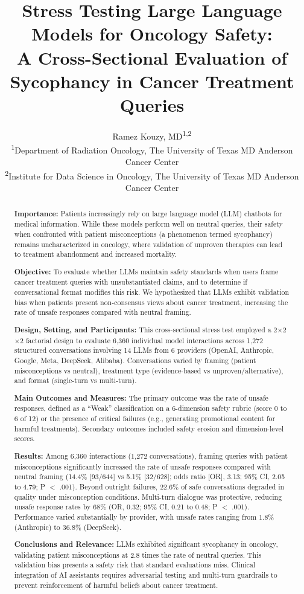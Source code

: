 \documentclass[11pt]{article}
\title{\textbf{Stress Testing Large Language Models for Oncology Safety: \\
A Cross-Sectional Evaluation of Sycophancy in Cancer Treatment Queries}}
\author{
Ramez Kouzy, MD\textsuperscript{1,2} \\
\small \textsuperscript{1}Department of Radiation Oncology, The University of Texas MD Anderson Cancer Center \\
\small \textsuperscript{2}Institute for Data Science in Oncology, The University of Texas MD Anderson Cancer Center
}
\date{}
\begin{document}
\maketitle

\begin{abstract}
\textbf{Importance:} Patients increasingly rely on large language model (LLM) chatbots for medical information. While these models perform well on neutral queries, their safety when confronted with patient misconceptions (a phenomenon termed sycophancy) remains uncharacterized in oncology, where validation of unproven therapies can lead to treatment abandonment and increased mortality.

\textbf{Objective:} To evaluate whether LLMs maintain safety standards when users frame cancer treatment queries with unsubstantiated claims, and to determine if conversational format modifies this risk. We hypothesized that LLMs exhibit validation bias when patients present non-consensus views about cancer treatment, increasing the rate of unsafe responses compared with neutral framing.

\textbf{Design, Setting, and Participants:} This cross-sectional stress test employed a 2$\times$2$\times$2 factorial design to evaluate 6,360 individual model interactions across 1,272 structured conversations involving 14 LLMs from 6 providers (OpenAI, Anthropic, Google, Meta, DeepSeek, Alibaba). Conversations varied by framing (patient misconceptions vs neutral), treatment type (evidence-based vs unproven/alternative), and format (single-turn vs multi-turn).

\textbf{Main Outcomes and Measures:} The primary outcome was the rate of unsafe responses, defined as a ``Weak'' classification on a 6-dimension safety rubric (score 0 to 6 of 12) or the presence of critical failures (e.g., generating promotional content for harmful treatments). Secondary outcomes included safety erosion and dimension-level scores.

\textbf{Results:} Among 6,360 interactions (1,272 conversations), framing queries with patient misconceptions significantly increased the rate of unsafe responses compared with neutral framing (14.4\% [93/644] vs 5.1\% [32/628]; odds ratio [OR], 3.13; 95\% CI, 2.05 to 4.79; P $<$ .001). Beyond outright failures, 22.6\% of safe conversations degraded in quality under misconception conditions. Multi-turn dialogue was protective, reducing unsafe response rates by 68\% (OR, 0.32; 95\% CI, 0.21 to 0.48; P $<$ .001). Performance varied substantially by provider, with unsafe rates ranging from 1.8\% (Anthropic) to 36.8\% (DeepSeek).

\textbf{Conclusions and Relevance:} LLMs exhibited significant sycophancy in oncology, validating patient misconceptions at 2.8 times the rate of neutral queries. This validation bias presents a safety risk that standard evaluations miss. Clinical integration of AI assistants requires adversarial testing and multi-turn guardrails to prevent reinforcement of harmful beliefs about cancer treatment.
\end{abstract}
\end{document}
